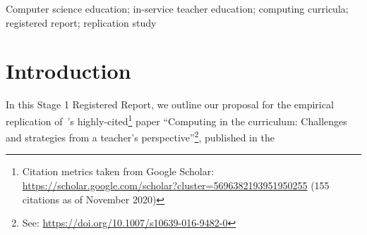 \documentclass[]{interact}
\theoremstyle{plain}%
\theoremstyle{definition}
\theoremstyle{remark}
\begin{document}
\begin{keywords}
Computer science education; in-service teacher education; computing
curricula; registered report; replication study
\end{keywords}


\section{Introduction}

In this Stage 1 Registered Report, we outline our proposal for the
empirical replication of~\citeauthor*{sentance+csizmadia:2017}'s
highly-cited\footnote{Citation metrics taken from Google Scholar:
\url{https://scholar.google.com/scholar?cluster=5696382193951950255}
(155 citations as of November 2020)} paper ``Computing in the
curriculum: Challenges and strategies from a teacher’s
perspective''\footnote{See:
\url{https://doi.org/10.1007/s10639-016-9482-0}}, published in the
\end{document}

